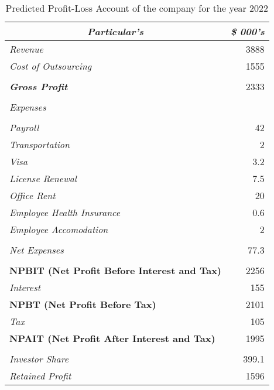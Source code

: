 \begin{table}[H]
  \centering
  \caption{Predicted Profit-Loss Account of the company for the year 2022}
    \begin{tabular}{|l|r|}
    \hline
    \hline
    \toprule
    \multicolumn{1}{|c|}{\textit{\textbf{Particular's}}} & \multicolumn{1}{c|}{\textit{\textbf{\$ 000's}}} \\
    \hline
    \hline
    \midrule
    \textit{Revenue} & 3888 \\
    \midrule
    \textit{Cost of Outsourcing} & 1555 \\
    \midrule
          &  \\
    \midrule
    \textit{\textbf{Gross Profit}} & 2333 \\
    \midrule
          &  \\
    \midrule
    \textit{Expenses} &  \\
    \midrule
          &  \\
    \midrule
    \textit{Payroll} & 42 \\
    \midrule
    \textit{Transportation} & 2 \\
    \midrule
    \textit{Visa} & 3.2 \\
    \midrule
    \textit{License Renewal} & 7.5 \\
    \midrule
    \textit{Office Rent} & 20 \\
    \midrule
    \textit{Employee Health Insurance} & 0.6 \\
    \midrule
    \textit{Employee Accomodation} & 2 \\
    \midrule
          &  \\
    \midrule
    \textit{Net Expenses} & 77.3 \\
    \midrule
          &  \\
    \midrule
    \textbf{NPBIT (Net Profit Before Interest and Tax)} & 2256 \\
    \midrule
    \textit{Interest} & 155 \\
    \midrule
    \textbf{NPBT (Net Profit Before Tax)} & 2101 \\
    \midrule
    \textit{Tax} & 105 \\
    \midrule
    \textbf{NPAIT (Net Profit After Interest and Tax)} & 1995 \\
    \midrule
          &  \\
    \midrule
    \textit{Investor Share} & 399.1 \\
    \midrule
    \textit{Retained Profit} & 1596 \\
    \bottomrule
    \hline
    \hline
    \end{tabular}%
  \label{tab:addlabel}%
\end{table}%

